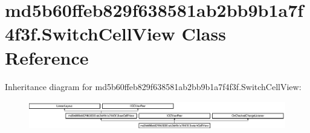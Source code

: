 \hypertarget{classmd5b60ffeb829f638581ab2bb9b1a7f4f3f_1_1SwitchCellView}{}\section{md5b60ffeb829f638581ab2bb9b1a7f4f3f.\+Switch\+Cell\+View Class Reference}
\label{classmd5b60ffeb829f638581ab2bb9b1a7f4f3f_1_1SwitchCellView}
Inheritance diagram for md5b60ffeb829f638581ab2bb9b1a7f4f3f.\+Switch\+Cell\+View\+:\begin{figure}[H]
\begin{center}
\leavevmode
\includegraphics[height=1.235294cm]{classmd5b60ffeb829f638581ab2bb9b1a7f4f3f_1_1SwitchCellView}
\end{center}
\end{figure}
